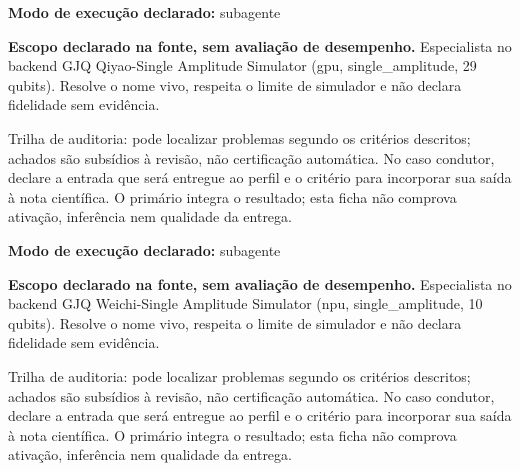 \begin{arquitetura}
\textbf{Modo de execução declarado:} subagente
\end{arquitetura}


\begin{descricao}
\textbf{Escopo declarado na fonte, sem avaliação de desempenho.}
Especialista no backend GJQ Qiyao-Single Amplitude Simulator (gpu, single\_amplitude, 29 qubits). Resolve o nome vivo, respeita o limite de simulador e não declara fidelidade sem evidência.
\end{descricao}

\begin{funcao}
Trilha de auditoria: pode localizar problemas segundo os critérios descritos; achados são subsídios à revisão, não certificação automática. No caso condutor, declare a entrada que será entregue ao perfil e o critério para incorporar sua saída à nota científica. O primário integra o resultado; esta ficha não comprova ativação, inferência nem qualidade da entrega.
\end{funcao}

\begin{arquitetura}
\textbf{Modo de execução declarado:} subagente
\end{arquitetura}


\begin{descricao}
\textbf{Escopo declarado na fonte, sem avaliação de desempenho.}
Especialista no backend GJQ Weichi-Single Amplitude Simulator (npu, single\_amplitude, 10 qubits). Resolve o nome vivo, respeita o limite de simulador e não declara fidelidade sem evidência.
\end{descricao}

\begin{funcao}
Trilha de auditoria: pode localizar problemas segundo os critérios descritos; achados são subsídios à revisão, não certificação automática. No caso condutor, declare a entrada que será entregue ao perfil e o critério para incorporar sua saída à nota científica. O primário integra o resultado; esta ficha não comprova ativação, inferência nem qualidade da entrega.
\end{funcao}

